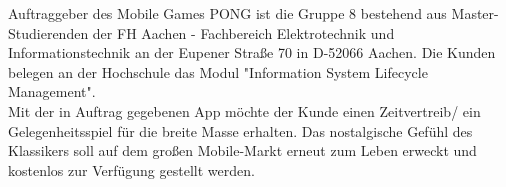 Auftraggeber des Mobile Games PONG ist die Gruppe 8 bestehend aus Master-Studierenden der FH Aachen - Fachbereich Elektrotechnik und Informationstechnik an der Eupener Straße 70 in D-52066 Aachen. Die Kunden belegen an der Hochschule das Modul "Information System Lifecycle Management". \\
Mit der in Auftrag gegebenen App möchte der Kunde einen Zeitvertreib/ ein Gelegenheitsspiel für die breite Masse erhalten. Das nostalgische Gefühl des Klassikers soll auf dem großen Mobile-Markt erneut zum Leben erweckt und kostenlos zur Verfügung gestellt werden.